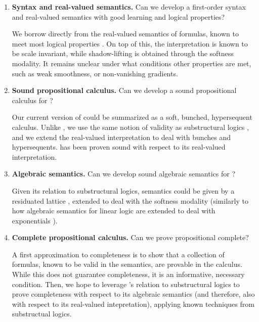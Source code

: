 \begin{enumerate}
    \item \textbf{Syntax and real-valued semantics.} Can we develop a first-order syntax and real-valued semantics with good learning and logical properties? 
    
    We borrow directly from \citeauthor{capucci2024quantifiers} the real-valued semantics of formulas, known to meet most logical properties \citep{capucci2024quantifiers}. On top of this, the interpretation is known to be scale invariant, while shadow-lifting is obtained through the softness modality. It remains unclear under what conditions other properties are met, such as weak smoothness, or non-vanishing gradients. 
    
    \item \textbf{Sound propositional calculus.} Can we develop a sound propositional calculus for \OL{}?
    
    Our current version of \OL{} could be summarized as a soft, bunched, hypersequent calculus. Unlike \citeauthor{capucci2024quantifiers}, we use the same notion of validity as substructural logics \citep{galatos2007residuated}, and we extend the real-valued interpretation to deal with bunches and hypersequents. \OL{} has been proven sound with respect to its real-valued interpretation. 

    \item \textbf{Algebraic semantics.} Can we develop sound algebraic semantics for \OL{}?
    
    Given its relation to substructural logics, \OL{} semantics could be given by a residuated lattice \citep{galatos2007residuated}, extended to deal with the softness modality (similarly to how algebraic semantics for linear logic are extended to deal with exponentials \citep{agliano2025algebraic}).
    
    \item \textbf{Complete propositional calculus.} Can we prove propositional \OL{} complete?
    
    A first approximation to completeness is to show that a collection of formulas, known to be valid in the semantics, are provable in the calculus. While this does not guarantee completeness, it is an informative, necessary condition. Then, we hope to leverage \OL{}'s relation to substructural logics to prove completeness with respect to its algebraic semantics (and therefore, also with respect to its real-valued intepretation), applying known techniques from substructual logics.


\end{enumerate}

